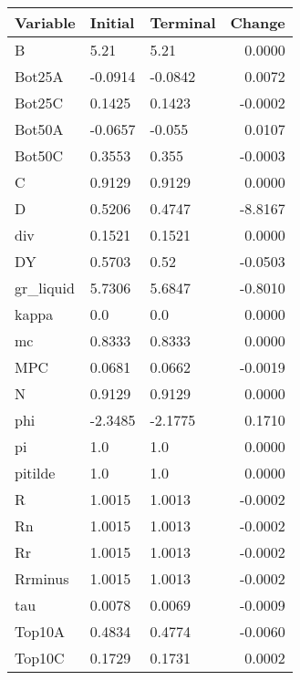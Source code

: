 \begin{table}
\centering
\label{tab:stst_comparison_baseline_limit_permanent}
\begin{tabular}{lllr}
\toprule
                Variable & Initial & Terminal &  Change \\
\midrule
                       B &    5.21 &     5.21 &  0.0000 \\
                  Bot25A & -0.0914 &  -0.0842 &  0.0072 \\
                  Bot25C &  0.1425 &   0.1423 & -0.0002 \\
                  Bot50A & -0.0657 &   -0.055 &  0.0107 \\
                  Bot50C &  0.3553 &    0.355 & -0.0003 \\
                       C &  0.9129 &   0.9129 &  0.0000 \\
                       D &  0.5206 &   0.4747 & -8.8167 \\
                     div &  0.1521 &   0.1521 &  0.0000 \\
                      DY &  0.5703 &     0.52 & -0.0503 \\
               gr\_liquid &  5.7306 &   5.6847 & -0.8010 \\
                   kappa &     0.0 &      0.0 &  0.0000 \\
                      mc &  0.8333 &   0.8333 &  0.0000 \\
                     MPC &  0.0681 &   0.0662 & -0.0019 \\
                       N &  0.9129 &   0.9129 &  0.0000 \\
                     phi & -2.3485 &  -2.1775 &  0.1710 \\
                      pi &     1.0 &      1.0 &  0.0000 \\
                 pitilde &     1.0 &      1.0 &  0.0000 \\
                       R &  1.0015 &   1.0013 & -0.0002 \\
                      Rn &  1.0015 &   1.0013 & -0.0002 \\
                      Rr &  1.0015 &   1.0013 & -0.0002 \\
                 Rrminus &  1.0015 &   1.0013 & -0.0002 \\
                     tau &  0.0078 &   0.0069 & -0.0009 \\
                  Top10A &  0.4834 &   0.4774 & -0.0060 \\
                  Top10C &  0.1729 &   0.1731 &  0.0002 \\

\end{tabular}
\end{table}
